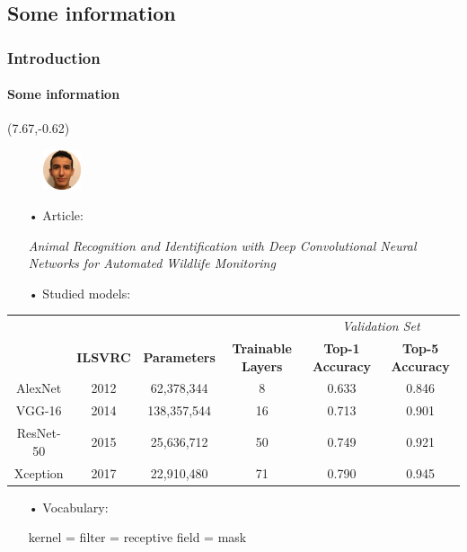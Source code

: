 \renewcommand{\arraystretch}{1.1}
\setlength{\tabcolsep}{2pt} %

\subsection{Some information}
\begin{frame}
\frametitle{Introduction}
\framesubtitle{Some information}

\begin{textblock}{15}(7.67,-0.62)
	\begin{figure}[H]
		\includegraphics[width=0.1\textwidth]{Images/Team/MehdiABOUZAID.png} 
	\end{figure}
\end{textblock}

\begin{itemize}
\item[•] Article:
\item[] \textsl{Animal Recognition and Identification with Deep Convolutional Neural
Networks for Automated Wildlife Monitoring}
\item[•] Studied models:
\end{itemize}

\begin{adjustwidth}{-1.5em}{-1.5em}
\begin{center}
{\fontsize{9.5}{15}\selectfont
\begin{tabular}{|c|c|c|c|c|c|}
\cline{5-6}
\multicolumn{4}{c|}{} & \multicolumn{2}{c|}{\textit{Validation Set}} \\
\cline{2-6}
\multicolumn{1}{c|}{} & \textbf{ILSVRC} & \textbf{Parameters} & \textbf{Trainable Layers} & \textbf{Top-1 Accuracy} & \textbf{Top-5 Accuracy} \\
\hline
AlexNet & 2012 & 62,378,344 & 8 & 0.633 & 0.846 \\
\hline
VGG-16 & 2014 & 138,357,544 & 16 & 0.713 & 0.901 \\
\hline
ResNet-50 & 2015 & 25,636,712 & 50 & 0.749 & 0.921 \\
\hline
Xception & 2017 & 22,910,480 & 71 & 0.790 & 0.945 \\
\hline
\end{tabular}
}
\end{center}
\end{adjustwidth}

\begin{itemize}
\item[•] Vocabulary:
\item[] kernel = filter = receptive field = mask
\end{itemize}

\end{frame}

